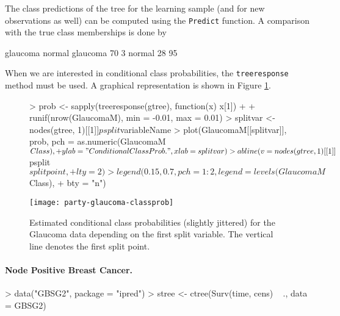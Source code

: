 \documentclass[letter]{article}
\begin{document}
The class predictions of the tree for the learning sample (and for new
observations as well) can be computed using the \texttt{Predict} function. A
comparison with the true class memberships is done by
\begin{Schunk}
\begin{Soutput}
           glaucoma normal
  glaucoma       70      3
  normal         28     95
\end{Soutput}
\end{Schunk}
When we are interested in conditional class probabilities, the
\texttt{treeresponse} method must be used. A graphical representation is
shown in Figure \ref{glaucoma-probplot}.

\begin{figure}[ht!]
\begin{center}
\begin{Schunk}
\begin{Sinput}
> prob <- sapply(treeresponse(gtree), function(x) x[1]) + 
+     runif(nrow(GlaucomaM), min = -0.01, max = 0.01)
> splitvar <- nodes(gtree, 1)[[1]]$psplit$variableName
> plot(GlaucomaM[[splitvar]], prob, pch = as.numeric(GlaucomaM$Class), 
+     ylab = "Conditional Class Prob.", xlab = splitvar)
> abline(v = nodes(gtree, 1)[[1]]$psplit$splitpoint, 
+     lty = 2)
> legend(0.15, 0.7, pch = 1:2, legend = levels(GlaucomaM$Class), 
+     bty = "n")
\end{Sinput}
\end{Schunk}
\texttt{[image: party-glaucoma-classprob]}
\caption{Estimated conditional class probabilities (slightly jittered) 
         for the Glaucoma data depending on the first split variable. 
         The vertical line denotes the first split point. \label{glaucoma-probplot}}
\end{center}
\end{figure}

\paragraph{Node Positive Breast Cancer.}

\begin{Schunk}
\begin{Sinput}
> data("GBSG2", package = "ipred")
> stree <- ctree(Surv(time, cens) ~ ., data = GBSG2)
\end{Sinput}
\end{Schunk}
\end{document}
